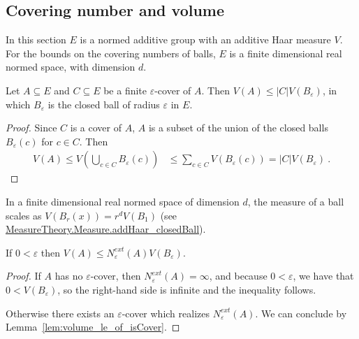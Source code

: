 \subsection{Covering number and volume}

In this section $E$ is a normed additive group with an additive Haar measure $V$. For the bounds on the covering numbers of balls, $E$ is a finite dimensional real normed space, with dimension $d$.

\begin{lemma}\label{lem:volume_le_of_isCover}
  \leanok
Let $A \subseteq E$ and $C \subseteq E$ be a finite $\varepsilon$-cover of $A$.
Then $V(A) \le \vert C \vert V(B_\varepsilon)$, in which $B_\varepsilon$ is the closed ball of radius $\varepsilon$ in $E$.
\end{lemma}

\begin{proof}\leanok
Since $C$ is a cover of $A$, $A$ is a subset of the union of the closed balls $B_\varepsilon(c)$ for $c \in C$. Then
\begin{align*}
  V(A) \le V(\bigcup_{c \in C} B_\varepsilon(c))
  &\le \sum_{c \in C} V(B_\varepsilon(c))
  = \vert C \vert V(B_\varepsilon)
  \: .
\end{align*}
\end{proof}

In a finite dimensional real normed space of dimension $d$, the measure of a ball scales as $V(B_r(x)) = r^d V(B_1)$ (see \href{https://leanprover-community.github.io/mathlib4_docs/Mathlib/MeasureTheory/Measure/Lebesgue/EqHaar.html#MeasureTheory.Measure.addHaar_closedBall}{MeasureTheory.Measure.addHaar\_closedBall}).


\begin{lemma}\label{lem:volume_le_externalCoveringNumber_mul}
  \leanok
If $0 < \varepsilon$ then $V(A) \le N^{ext}_\varepsilon(A) V(B_\varepsilon)$.
\end{lemma}

\begin{proof}\leanok
If $A$ has no $\varepsilon$-cover, then $N^{ext}_\varepsilon(A) = \infty$, and because $0 < \varepsilon$, we have that $0 < V(B_\varepsilon)$, so the right-hand side is infinite and the inequality follows.

Otherwise there exists an $\varepsilon$-cover which realizes $N^{ext}_\varepsilon(A)$. We can conclude by Lemma~\ref{lem:volume_le_of_isCover}.
\end{proof}


